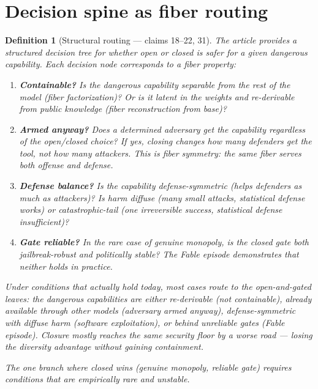 \documentclass[11pt,a4paper]{article}
\newtheorem{definition}{Definition}[section]
\begin{document}
\section{Decision spine as fiber routing}
\label{sec:spine}

\begin{definition}[Structural routing --- claims 18--22, 31]
\label{def:spine}
The article provides a structured decision tree for whether open or
closed is safer for a given dangerous capability. Each decision node
corresponds to a fiber property:

\begin{enumerate}
\item \textbf{Containable?} Is the dangerous capability separable
  from the rest of the model (fiber factorization)? Or is it latent
  in the weights and re-derivable from public knowledge (fiber
  reconstruction from base)?

\item \textbf{Armed anyway?} Does a determined adversary get the
  capability regardless of the open/closed choice? If yes, closing
  changes how many \emph{defenders} get the tool, not how many
  attackers. This is fiber symmetry: the same fiber serves both
  offense and defense.

\item \textbf{Defense balance?} Is the capability defense-symmetric
  (helps defenders as much as attackers)? Is harm diffuse (many small
  attacks, statistical defense works) or catastrophic-tail (one
  irreversible success, statistical defense insufficient)?

\item \textbf{Gate reliable?} In the rare case of genuine monopoly,
  is the closed gate both jailbreak-robust and politically stable?
  The Fable episode demonstrates that neither holds in practice.
\end{enumerate}

Under conditions that actually hold today, most cases route to the
open-and-gated leaves: the dangerous capabilities are either
re-derivable (not containable), already available through other
models (adversary armed anyway), defense-symmetric with diffuse
harm (software exploitation), or behind unreliable gates (Fable
episode). Closure mostly reaches the same security floor by a worse
road --- losing the diversity advantage without gaining containment.

The one branch where closed wins (genuine monopoly, reliable gate)
requires conditions that are empirically rare and unstable.
\end{definition}
\end{document}
